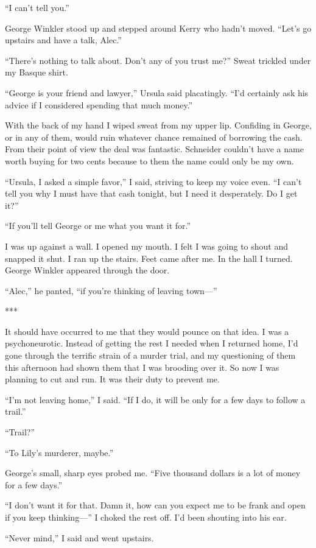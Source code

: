 \documentclass{novel}
\begin{document}
{“I can’t tell you.”

George Winkler stood up and stepped around Kerry who hadn’t moved. “Let’s go upstairs and have a talk, Alec.”

“There’s nothing to talk about. Don’t any of you trust me?” Sweat trickled under my Basque shirt.

“George is your friend and lawyer,” Ursula said placatingly. “I’d certainly ask his advice if I considered spending that much money.”

With the back of my hand I wiped sweat from my upper lip. Confiding in George, or in any of them, would ruin whatever chance remained of borrowing the cash. From their point of view the deal was fantastic. Schneider couldn’t have a name worth buying for two cents because to them the name could only be my own.

“Ursula, I asked a simple favor,” I said, striving to keep my voice even. “I can’t tell you why I must have that cash tonight, but I need it desperately. Do I get it?”

“If you’ll tell George or me what you want it for.”

I was up against a wall. I opened my mouth. I felt I was going to shout and snapped it shut. I ran up the stairs. Feet came after me. In the hall I turned. George Winkler appeared through the door.

“Alec,” he panted, “if you’re thinking of leaving town—”

***

It should have occurred to me that they would pounce on that idea. I was a psychoneurotic. Instead of getting the rest I needed when I returned home, I’d gone through the terrific strain of a murder trial, and my questioning of them this afternoon had shown them that I was brooding over it. So now I was planning to cut and run. It was their duty to prevent me.

“I’m not leaving home,” I said. “If I do, it will be only for a few days to follow a trail.”

“Trail?”

“To Lily’s murderer, maybe.”

George’s small, sharp eyes probed me. “Five thousand dollars is a lot of money for a few days.”

“I don’t want it for that. Damn it, how can you expect me to be frank and open if you keep thinking—” I choked the rest off. I’d been shouting into his ear.

“Never mind,” I said and went upstairs.

}
\end{document}
